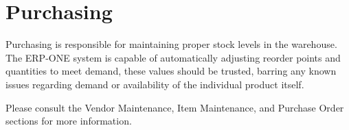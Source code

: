 \section{Purchasing}

Purchasing is responsible for maintaining proper stock levels in the warehouse.  The ERP-ONE system is capable of automatically adjusting reorder points and quantities to meet demand, these values should be trusted, barring any known issues regarding demand or availability of the individual product itself.

Please consult the Vendor Maintenance, Item Maintenance, and Purchase Order sections for more information.